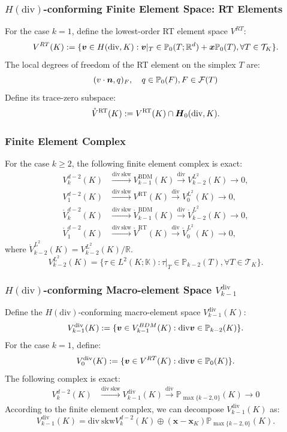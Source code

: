 \documentclass[notheorems,serif]{beamer}
\begin{document}
\begin{CJK}{UTF8}{gkai}
\begin{frame}
    \frametitle{$H(\mathrm{div})$-conforming Finite Element Space: RT Elements}
For the case $k=1$, define the lowest-order RT element space $V^{RT}$:
$$
V^{RT}(K) := \{\boldsymbol{v} \in H(\mathrm{div}, K) : \boldsymbol{v}|_T \in
\mathbb{P}_{0}(T; \mathbb{R}^d) + \boldsymbol{x}\mathbb{P}_{0}(T),
\forall T \in \mathcal{T}_K\}.
$$
The local degrees of freedom of the RT element on the simplex $T$ are:
$$
(v\cdot\boldsymbol{n},q)_{F}, \quad
q\in\mathbb{P}_{0}(F), F\in\mathcal{F}(T)
$$
Define its trace-zero subspace:
$$
\mathring{V}^{\mathrm{RT}}(K):=V^{\mathrm{RT}}(K)\cap\boldsymbol{H}_{0}(\mathrm{div},K).
$$
\end{frame}

\begin{frame}
    \frametitle{Finite Element Complex}
For the case $k \geq 2$, the following finite element complex is exact:
$$
\begin{aligned}
V_{k}^{d-2}(K) & \xrightarrow{\mathrm{div~skw}}
V_{k-1}^{\mathrm{BDM}}(K) \xrightarrow{\mathrm{div}} V_{k-2}^{L^{2}}(K)
\to 0, \\
V_{1}^{d-2}(K) & \xrightarrow{\mathrm{div~skw}}
V^{\mathrm{RT}}(K) \xrightarrow{\mathrm{div}} V_{0}^{L^{2}}(K)
\to 0, \\
\mathring{V}_{k}^{d-2}(K) & \xrightarrow{\mathrm{div~skw}}
\mathring{V}_{k-1}^{\mathrm{BDM}}(K) \xrightarrow{\mathrm{div}}
\mathring{V}_{k-2}^{L^{2}}(K) \to 0, \\
\mathring{V}_{1}^{d-2}(K) & \xrightarrow{\mathrm{div~skw}}
\mathring{V}^{\mathrm{RT}}(K) \xrightarrow{\mathrm{div}}
\mathring{V}_{0}^{L^{2}}(K) \to 0,
\end{aligned}
$$
where $\mathring{V}_{k-2}^{L^{2}}(K) = V_{k-2}^{L^{2}}(K) / \mathbb{R}$.
$$
V_{k-2}^{L^{2}}(K) = \{\tau \in L^2(K; \mathbb{K}) : \tau|_T \in
\mathbb{P}_{k-2}(T), \forall T \in \mathcal{T}_K\}.
$$
\end{frame}

\begin{frame}
    \frametitle{$H(\mathrm{div})$-conforming Macro-element Space $V^{\mathrm{div}}_{k-1}$}
Define the $H(\mathrm{div})$-conforming macro-element space $V^{\mathrm{div}}_{k-1}(K)$:
$$
V^{\mathrm{div}}_{k-1}(K) := \{\boldsymbol{v} \in V^{BDM}_{k-1}(K) : \mathrm{div}
\boldsymbol{v} \in \mathbb{P}_{k-2}(K)\}.
$$
For the case $k=1$, define:
$$
V^{\mathrm{div}}_{0}(K) := \{\boldsymbol{v} \in V^{RT}(K) : \mathrm{div}
\boldsymbol{v} \in \mathbb{P}_{0}(K)\}.
$$
The following complex is exact:
$$
\begin{aligned}
V_{k}^{d-2}(K) & \xrightarrow{\mathrm{div~skw}}
V^{\mathrm{div}}_{k-1}(K) \xrightarrow{\mathrm{div}}
\mathbb{P}_{\max\{k-2, 0\}}(K) \to 0
\end{aligned}
$$
According to the finite element complex, we can decompose $V^{\mathrm{div}}_{k-1}(K)$ as:
$$
V^{\mathrm{div}}_{k-1}(K) = \mathrm{div~skw}V_{k}^{d-2}(K) \oplus 
(\boldsymbol{x-x}_K)\mathbb{P}_{\max\{k-2, 0\}}(K).
$$
\end{frame}


\end{CJK}
\end{document}
